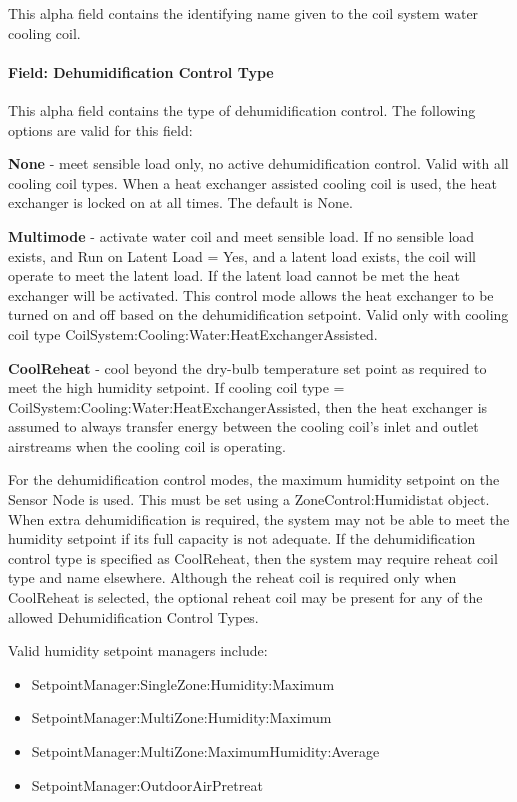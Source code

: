 This alpha field contains the identifying name given to the coil system water cooling coil.

\paragraph{Field: Dehumidification Control Type}

This alpha field contains the type of dehumidification control. The following options are valid for this field:

\textbf{None} - meet sensible load only, no active dehumidification control. Valid with all cooling coil types. When a heat exchanger assisted cooling coil is used, the heat exchanger is locked on at all times. The default is None.

\textbf{Multimode} - activate water coil and meet sensible load. If no sensible load exists, and Run on Latent Load = Yes, and a latent load exists, the coil will operate to meet the latent load. If the latent load cannot be met the heat exchanger will be activated. This control mode allows the heat exchanger to be turned on and off based on the dehumidification setpoint. Valid only with cooling coil type CoilSystem:Cooling:Water:HeatExchangerAssisted.

\textbf{CoolReheat} - cool beyond the dry-bulb temperature set point as required to meet the high humidity setpoint. If cooling coil type = CoilSystem:Cooling:Water:HeatExchangerAssisted, then the heat exchanger is assumed to always transfer energy between the cooling coil's inlet and outlet airstreams when the cooling coil is operating.


For the dehumidification control modes, the maximum humidity setpoint on the Sensor Node is used. This must be set using a ZoneControl:Humidistat object. When extra dehumidification is required, the system may not be able to meet the humidity setpoint if its full capacity is not adequate. If the dehumidification control type is specified as CoolReheat, then the system may require reheat coil type and name elsewhere. Although the reheat coil is required only when CoolReheat is selected, the optional reheat coil may be present for any of the allowed Dehumidification Control Types.

Valid humidity setpoint managers include:
\begin{itemize}
\item SetpointManager:SingleZone:Humidity:Maximum
\item SetpointManager:MultiZone:Humidity:Maximum
\item SetpointManager:MultiZone:MaximumHumidity:Average
\item SetpointManager:OutdoorAirPretreat
\end{itemize}

